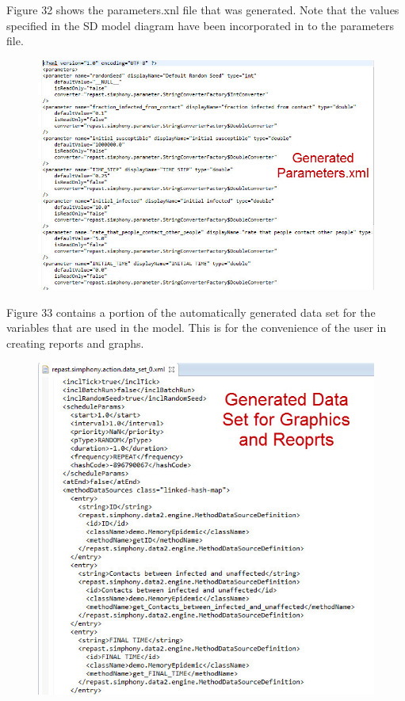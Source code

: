 \documentclass[11pt]{amsart}
\begin{document}
Figure 32 shows the parameters.xnl file that was generated. Note that the values specified in the SD model diagram have been incorporated in to the parameters file.


\begin{figure}[ht]
\begin{center}
\vspace{.2in}
\centerline {
\includegraphics[totalheight=0.4\textheight]{images/032.jpg}
}
\caption{}
\label{fig:032}
\end{center}
\end{figure}

Figure 33 contains a portion of the automatically generated data set for the variables that are used in the model. This is for the convenience of the user in creating reports and graphs. 

\clearpage

\begin{figure}[ht]
\begin{center}
\vspace{.2in}
\centerline {
\includegraphics[totalheight=0.5\textheight]{images/033.jpg}
}
\caption{}
\label{fig:033}
\end{center}
\end{figure}
\end{document}
